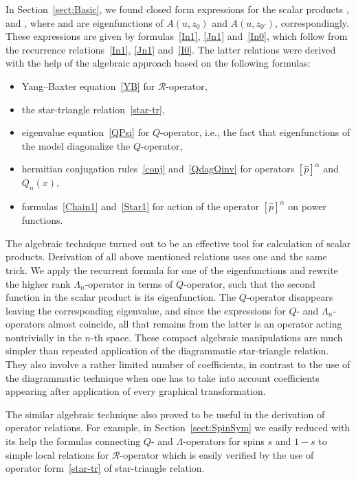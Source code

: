 \documentclass[pdftex]{sigma}
\numberwithin{equation}{section}
\begin{document}
In Section~\ref{sect:Basic}, we found closed form expressions for the scalar products
,
 and ,
where  and  are eigenfunctions of $A(u,z_0)$ and $A(u,z_{0'})$, correspondingly. These expressions are given by formulas~\eqref{In1}, \eqref{Jn1} and~\eqref{In0}, which follow from the
recurrence relations~\eqref{In1}, \eqref{Jn1} and~\eqref{I0}. The latter relations were derived with the help of the algebraic approach based on the following formulas:
\begin{itemize}\itemsep=0pt
	\item Yang--Baxter equation~\eqref{YB} for $\mathcal{R}$-operator,
	\item the star-triangle relation~\eqref{star-tr},
	\item eigenvalue equation~\eqref{QPsi} for $Q$-operator, i.e., the fact that eigenfunctions of the model diagonalize the $Q$-operator,
	\item hermitian conjugation rules~\eqref{conj} and~\eqref{QdagQinv} for operators $[\hat{p}]^\alpha$ and $Q_n(x)$,
	\item formulas~\eqref{Chain1} and~\eqref{Star1} for action of the operator $[\hat{p}]^\alpha$ on power functions.
\end{itemize}
The algebraic technique turned out to be an effective tool for calculation of scalar products. Derivation of all above mentioned relations uses one and the same trick. We apply the recurrent formula for one of the eigenfunctions and rewrite the higher rank $\Lambda_n$-operator in terms of $Q$-operator, such that the second function in the scalar product is its eigenfunction.
The $Q$-operator disappears leaving the corresponding eigenvalue, and since the expressions for $Q$- and $\Lambda_n$-operators almost coincide, all that remains from the latter is an operator acting nontrivially in the $n$-th space. These compact algebraic manipulations are much simpler than repeated application of the diagrammatic star-triangle relation. They also involve a rather limited number of coefficients, in contrast to the use of the diagrammatic technique when one has to take into account coefficients appearing after application of every graphical transformation.

The similar algebraic technique also proved to be useful in the derivation of operator relations. For example, in Section~\ref{sect:SpinSym} we easily reduced with its help the formulas connecting $Q$- and $\Lambda$-operators for spins $s$ and $1-s$ to simple local relations for $\mathcal{R}$-operator which is easily verified by the use of operator form~\eqref{star-tr} of star-triangle relation.
\end{document}
